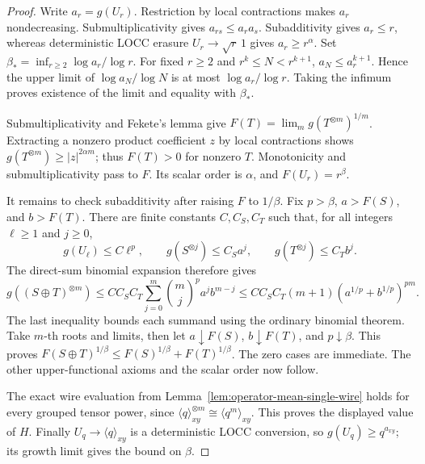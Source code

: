 \begin{proof}
Write \(a_r=g(U_r)\).  Restriction by local contractions makes \(a_r\) nondecreasing.  Submultiplicativity gives \(a_{rs}\leq a_ra_s\).  Subadditivity gives \(a_r\leq r\), whereas deterministic LOCC erasure \(U_r\to\sqrt r\,1\) gives \(a_r\geq r^\alpha\).  Set
\(\beta_*=\inf_{r\geq2}\log a_r/\log r\).
For fixed \(r\geq2\) and \(r^k\leq N<r^{k+1}\),
\(a_N\leq a_r^{k+1}\).  Hence the upper limit of
\(\log a_N/\log N\) is at most \(\log a_r/\log r\).  Taking the infimum proves existence of the limit and equality with \(\beta_*\).

Submultiplicativity and Fekete's lemma give
\(F(T)=\lim_m g(T^{\otimes m})^{1/m}\).
Extracting a nonzero product coefficient \(z\) by local contractions shows
\(g(T^{\otimes m})\geq |z|^{2\alpha m}\); thus \(F(T)>0\) for nonzero \(T\).
Monotonicity and submultiplicativity pass to \(F\).  Its scalar order is \(\alpha\), and
\(F(U_r)=r^\beta\).

It remains to check subadditivity after raising \(F\) to \(1/\beta\).
Fix \(p>\beta\), \(a>F(S)\), and \(b>F(T)\).  There are finite constants
\(C,C_S,C_T\) such that, for all integers \(\ell\geq1\) and \(j\geq0\),
\[
 g(U_\ell)\leq C\ell^p,\qquad
 g(S^{\otimes j})\leq C_Sa^j,\qquad
 g(T^{\otimes j})\leq C_Tb^j.
\]
The direct-sum binomial expansion therefore gives
\[
 g((S\oplus T)^{\otimes m})
 \leq CC_SC_T\sum_{j=0}^m\binom mj^p a^jb^{m-j}
 \leq CC_SC_T(m+1)(a^{1/p}+b^{1/p})^{pm}.
\]
The last inequality bounds each summand using the ordinary binomial theorem.
Take \(m\)-th roots and limits, then let \(a\downarrow F(S)\),
\(b\downarrow F(T)\), and \(p\downarrow\beta\).  This proves
\(F(S\oplus T)^{1/\beta}\leq F(S)^{1/\beta}+F(T)^{1/\beta}\).
The zero cases are immediate.  The other upper-functional axioms and the scalar order now follow.

The exact wire evaluation from Lemma~\ref{lem:operator-mean-single-wire}
holds for every grouped tensor power, since
\(\langle q\rangle_{xy}^{\otimes m}\cong\langle q^m\rangle_{xy}\).
This proves the displayed value of \(H\).
Finally \(U_q\to\langle q\rangle_{xy}\) is a deterministic LOCC conversion,
so \(g(U_q)\geq q^{a_{xy}}\); its growth limit gives the bound on \(\beta\).
\end{proof}

